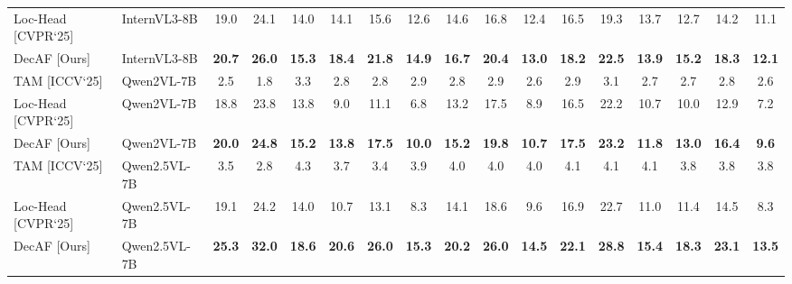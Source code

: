 \begin{table}[t!]
{\begin{tabular}{l l  ccc  ccc  ccc  ccc  ccc}
\\ \midrule
\rowcolor{longBlue!50} Loc-Head {\scriptsize [CVPR`25]} & InternVL3-8B & 19.0 & 24.1 & 14.0 & 14.1 & 15.6 & 12.6 & 14.6 & 16.8 & 12.4 & 16.5 & 19.3 & 13.7 & 12.7 & 14.2 & 11.1
\\
\rowcolor{longBlue!50} DecAF {\scriptsize [Ours]} & InternVL3-8B & \textbf{20.7} & \textbf{26.0} & \textbf{15.3} & \textbf{18.4} & \textbf{21.8} & \textbf{14.9} & \textbf{16.7} & \textbf{20.4} & \textbf{13.0} & \textbf{18.2} & \textbf{22.5} & \textbf{13.9} & \textbf{15.2} & \textbf{18.3} & \textbf{12.1}
\\ \midrule
\rowcolor{lavendar!30} TAM {\scriptsize [ICCV`25]} & Qwen2VL-7B & 2.5 & 1.8 & 3.3 & 2.8 & 2.8 & 2.9 & 2.8 & 2.9 & 2.6 & 2.9 & 3.1 & 2.7 & 2.7 & 2.8 & 2.6
\\
\rowcolor{lavendar!30} Loc-Head {\scriptsize [CVPR`25]} & Qwen2VL-7B & 18.8 & 23.8 & 13.8 & 9.0 & 11.1 & 6.8 & 13.2 & 17.5 & 8.9 & 16.5 & 22.2 & 10.7 & 10.0 & 12.9 & 7.2
\\
\rowcolor{lavendar!30} DecAF {\scriptsize [Ours]} & Qwen2VL-7B & \textbf{20.0} & \textbf{24.8} & \textbf{15.2} & \textbf{13.8} & \textbf{17.5} & \textbf{10.0} & \textbf{15.2} & \textbf{19.8} & \textbf{10.7} & \textbf{17.5} & \textbf{23.2} & \textbf{11.8} & \textbf{13.0} & \textbf{16.4} & \textbf{9.6}
\\ \midrule
\rowcolor{lavendar!70} TAM {\scriptsize [ICCV`25]} & Qwen2.5VL-7B & 3.5 & 2.8 & 4.3 & 3.7 & 3.4 & 3.9 & 4.0 & 4.0 & 4.0 & 4.1 & 4.1 & 4.1 & 3.8 & 3.8 & 3.8
\\
\rowcolor{lavendar!70} Loc-Head {\scriptsize [CVPR`25]} & Qwen2.5VL-7B & 19.1 & 24.2 & 14.0 & 10.7 & 13.1 & 8.3 & 14.1 & 18.6 & 9.6 & 16.9 & 22.7 & 11.0 & 11.4 & 14.5 & 8.3
\\
\rowcolor{lavendar!70} DecAF {\scriptsize [Ours]} & Qwen2.5VL-7B & \textbf{25.3} & \textbf{32.0} & \textbf{18.6} & \textbf{20.6} & \textbf{26.0} & \textbf{15.3} & \textbf{20.2} & \textbf{26.0} & \textbf{14.5} & \textbf{22.1} & \textbf{28.8} & \textbf{15.4} & \textbf{18.3} & \textbf{23.1} & \textbf{13.5}
\\
\bottomrule
\end{tabular}
}
\end{table}
